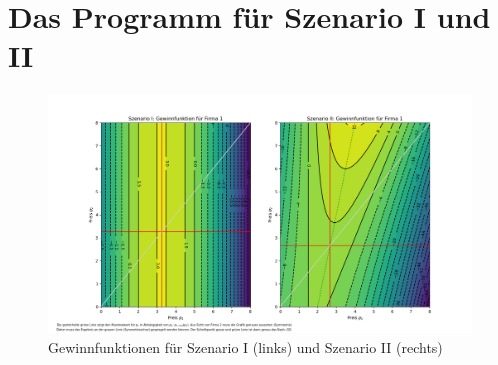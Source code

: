 \documentclass[paper=a4,notitlepage,parskip=half,plainheadsepline]{scrartcl}
\begin{document}
\section{Das Programm für Szenario I und II}
%
\begin{figure}
\begin{center}
\includegraphics[width=1.02\textwidth]{nashBoth.png}
\caption{Gewinnfunktionen für Szenario I (links) und Szenario II (rechts)}
\label{fig:Doppelgrafik}
\end{center}
\end{figure}

\fi
\end{document}
